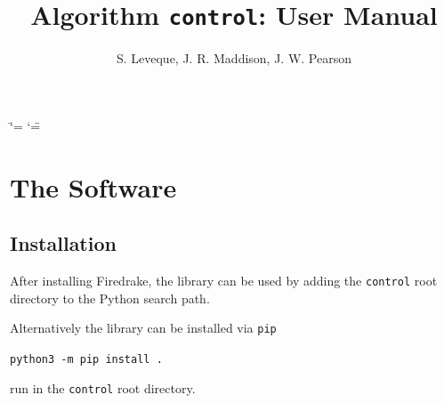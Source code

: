 \documentclass[letterpaper,10pt,english]{sphinxmanual}
\title{Algorithm \texttt{control}: User Manual}
\date{}%
\author{S.\@{} Leveque, J.\@{} R.\@{} Maddison, J.\@{} W.\@{} Pearson}
\begin{document}
\ifdefined\shorthandoff
  \ifnum\catcode`\=\string=\active\shorthandoff{=}\fi
  \ifnum\catcode`\"=\active{}\fi
\fi

\pagestyle{empty}
\sphinxmaketitle
\pagestyle{plain}
\sphinxtableofcontents
\pagestyle{normal}
\label{\detokenize{index::doc}}


\renewcommand{\indexname}{Index}
\printindex



\chapter{The Software}

\section{Installation}
After installing Firedrake, the library can be used by adding the \texttt{control} root directory to the Python search path.

Alternatively the library can be installed via \texttt{pip}

\texttt{python3 -m pip install .}

run in the \texttt{control} root directory.
\end{document}
